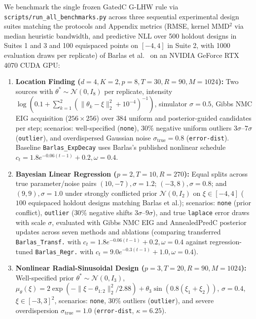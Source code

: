 \documentclass[11pt,a4paper,reqno]{amsart}
\theoremstyle{definition}
\theoremstyle{remark}
\newcommand{\Ncal}{\mathcal{N}}
\begin{document}
We benchmark the single frozen GatedC G-LHW rule via \nolinkurl{scripts/run_all_benchmarks.py} across three sequential experimental design suites matching the protocols and Appendix metrics (RMSE, kernel MMD$^2$ via median heuristic bandwidth, and predictive NLL over 500 holdout designs in Suites 1 and 3 and 100 equispaced points on $[-4, 4]$ in Suite 2, with 1000 evaluation draws per replicate) of Barlas et al.~\cite{barlas2025gboed} on an NVIDIA GeForce RTX 4070 CUDA GPU:
\begin{enumerate}[label=\arabic*.]
\item \textbf{Location Finding ($d=4, K=2, p=8, T=30, R=90, M=1024$):} Two sources with $\theta^* \sim \Ncal(0, I_8)$ per replicate, intensity $\log(0.1 + \sum_{k=1}^2 (\|\theta_k - \xi\|_2^2 + 10^{-4})^{-1})$, simulator $\sigma = 0.5$, Gibbs NMC EIG acquisition ($256 \times 256$) over $384$ uniform and posterior-guided candidates per step; scenarios: well-specified (\texttt{none}), $30\%$ negative uniform outliers $3\sigma$--$7\sigma$ (\texttt{outlier}), and overdispersed Gaussian noise $\sigma_{\mathrm{true}} = 0.8$ (\texttt{error-dist}). Baseline \texttt{Barlas\_ExpDecay} uses Barlas's published nonlinear schedule $c_t = 1.8 e^{-0.06(t-1)} + 0.2, \omega = 0.4$.
\item \textbf{Bayesian Linear Regression ($p=2, T=10, R=270$):} Equal splits across true parameter/noise pairs $(10,-7), \sigma=1.2$; $(-3,8), \sigma=0.8$; and $(9,9), \sigma=1.0$ under strongly conflicted prior $\Ncal(0, I_2)$ on $\xi \in [-4, 4]$ ($100$ equispaced holdout designs matching Barlas et al.); scenarios: \texttt{none} (prior conflict), \texttt{outlier} ($30\%$ negative shifts $3\sigma$--$9\sigma$), and true \texttt{laplace} error draws with scale $\sigma$, evaluated with Gibbs NMC EIG and AnnealedPredC posterior updates across seven methods and ablations (comparing transferred \texttt{Barlas\_Transf.} with $c_t = 1.8 e^{-0.06(t-1)} + 0.2, \omega = 0.4$ against regression-tuned \texttt{Barlas\_Regr.} with $c_t = 9.0 e^{-0.3(t-1)} + 1.0, \omega = 0.4$).
\item \textbf{Nonlinear Radial-Sinusoidal Design ($p=3, T=20, R=90, M=1024$):} Well-specified prior $\theta^* \sim \Ncal(0, I_3)$, $\mu_\theta(\xi) = 2\exp(-\|\xi - \theta_{1:2}\|_2^2 / 2.88) + \theta_3\sin(0.8(\xi_1+\xi_2))$, $\sigma = 0.4$, $\xi \in [-3,3]^2$, scenarios: \texttt{none}, $30\%$ outliers (\texttt{outlier}), and severe overdispersion $\sigma_{\mathrm{true}} = 1.0$ (\texttt{error-dist}, $\kappa = 6.25$).
\end{enumerate}
\end{document}
